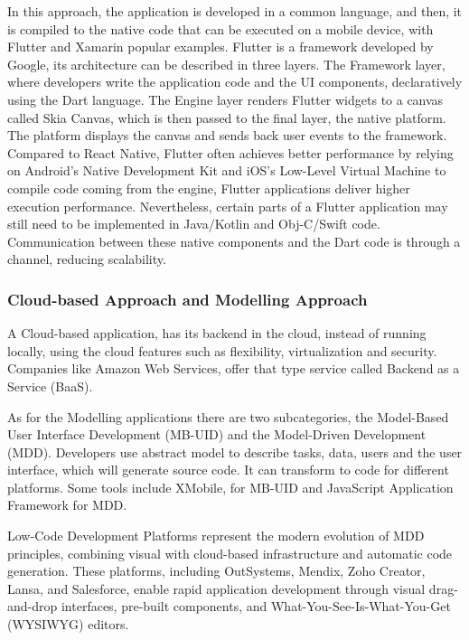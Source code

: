 In this approach, the application is developed in a common language, and then, it is compiled to the native code that can be executed on a mobile device, with Flutter and Xamarin popular examples\cite{Huber2021}. Flutter is a framework developed by Google, its architecture can be described in three layers\cite{Nagy2022}. The Framework layer, where developers write the application code and the UI components, declaratively using the Dart language. The Engine layer renders Flutter widgets to a canvas called Skia Canvas, which is then passed to the final layer, the native platform. The platform displays the canvas and sends back user events to the framework.\cite{Nagy2022} Compared to React Native, Flutter often achieves better performance by relying on Android's Native Development Kit and iOS's Low-Level Virtual Machine to compile code coming from the engine, Flutter applications deliver higher execution performance. Nevertheless, certain parts of a Flutter application may still need to be implemented in Java/Kotlin and Obj-C/Swift code. Communication between these native components and the Dart code is through a channel, reducing scalability\cite{Nagy2022}.

\subsubsection{Cloud-based Approach and Modelling Approach}

A Cloud-based application, has its backend in the cloud, instead of running locally, using the cloud features such as flexibility, virtualization and security\cite{ELKASSAS2017163}. Companies like Amazon Web Services, offer that type service called Backend as a Service (BaaS)\cite{Khachouch2020}. 

As for the Modelling applications there are two subcategories, the Model-Based User Interface Development (MB-UID) and the Model-Driven Development (MDD). Developers use abstract model to describe tasks, data, users and the user interface, which will generate source code. It can transform to code for different platforms. Some tools include XMobile, for MB-UID and JavaScript Application Framework for MDD\cite{Khachouch2020}.

Low-Code Development Platforms represent the modern evolution of MDD principles, combining visual with cloud-based infrastructure and automatic code generation. These platforms, including OutSystems, Mendix, Zoho Creator, Lansa, and Salesforce, enable rapid application development through visual drag-and-drop interfaces, pre-built components, and What-You-See-Is-What-You-Get (WYSIWYG) editors.\cite{9908726} 

